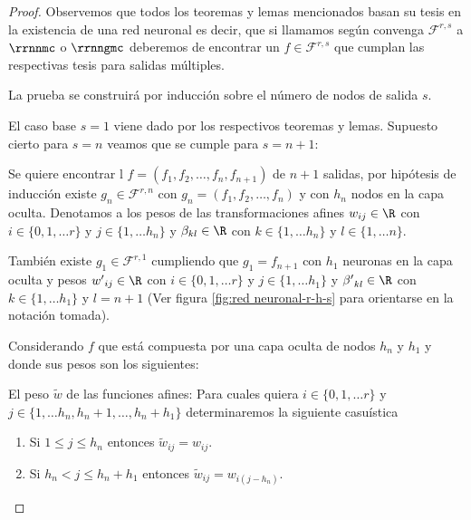 \begin{proof}
    Observemos que todos los teoremas y lemas mencionados basan su tesis
    en la existencia de una red neuronal es decir, que si llamamos según 
    convenga $\mathcal{F}^{r,s}$ a $\rrnnmc$ o $\rrnngmc$ deberemos de 
    encontrar un $f \in \mathcal{F}^{r,s}$ que cumplan las respectivas tesis para salidas múltiples. 

    La prueba se construirá por inducción sobre el número de nodos de salida $s$. 

    El caso base $s=1$ viene dado por los respectivos teoremas y lemas.
    Supuesto cierto para $s = n$ veamos que se cumple para $s=n+1$: 
    
    Se quiere encontrar l 
    $f = (f_1, f_2, \ldots, f_n, f_{n+1})$ de $n+1$ salidas, 
    por hipótesis de inducción existe $g_n \in \mathcal{F}^{r,n}$ con
     $g_n = (f_1, f_2, \ldots, f_n)$ y con $h_n$ nodos en la capa oculta. Denotamos a los pesos de las transformaciones afines 
     $w_{i j} \in \R$ con 
     $i \in \{0, 1, \ldots r \}$  y  $j \in \{1, \ldots h_n \}$ 
     y $\beta_{ k l} \in \R$ con 
     $k \in \{1, \ldots h_n \}$  y  $l \in \{1, \ldots n \}.$

    También existe $g_1 \in \mathcal{F}^{r,1}$ cumpliendo que
    $g_1 = f_{n+1}$ con $h_1$ neuronas en la capa oculta
    y pesos  
    ${w'}_{i j} \in \R$ con 
     $i \in \{0, 1, \ldots r \}$  y  $j \in \{1, \ldots h_1 \}$ 
     y ${\beta '}_{ k l} \in \R$ con 
     $k \in \{1, \ldots h_1 \}$  y  $l = {n+1}$
     (Ver figura \ref{fig:red neuronal-r-h-s} para orientarse en la notación tomada).
     
    Considerando $f$ que está compuesta por una capa oculta de nodos $h_n$ y $h_1$ y donde sus pesos son los siguientes:

    El peso $\tilde{w}$ de las funciones afines: 
    Para cuales quiera 
    $i \in \{0, 1, \ldots r \}$  y  
    $j \in \{1, \ldots h_n, h_{n} + 1, \ldots, h_n + h_1\}$  determinaremos la siguiente casuística
    \begin{enumerate}
        \item Si $1 \leq j \leq h_n$ entonces $\tilde{w}_{i j} = w_{i j}.$
        \item Si $h_n < j \leq h_n + h_1$ entonces $\tilde{w}_{i j} = w_{i (j-h_n)}.$
    \end{enumerate}


\end{proof}
